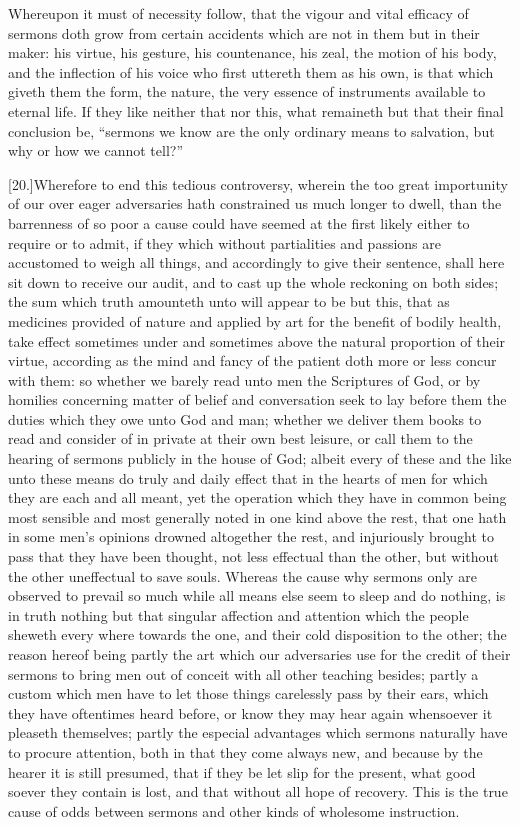 Whereupon it must of necessity follow, that the vigour and vital efficacy of sermons doth grow from certain accidents which are not in them but in their maker: his virtue, his gesture, his countenance, his zeal, the motion of his body, and the inflection of his voice who first uttereth them as his own, is that which giveth them the form, the nature, the very essence of instruments available to eternal life. If they like neither that nor this, what remaineth but that their final conclusion be, “sermons we know are the only ordinary means to salvation, but why or how we cannot tell?”

[20.]Wherefore to end this tedious controversy, wherein the too great importunity of our over eager adversaries hath constrained us much longer to dwell, than the barrenness of so poor a cause could have seemed at the first likely either to  require or to admit, if they which without partialities and passions are accustomed to weigh all things, and accordingly to give their sentence, shall here sit down to receive our audit, and to cast up the whole reckoning on both sides; the sum which truth amounteth unto will appear to be but this, that as medicines provided of nature and applied by art for the benefit of bodily health, take effect sometimes under and sometimes above the natural proportion of their virtue, according as the mind and fancy of the patient doth more or less concur with them: so whether we barely read unto men the Scriptures of God, or by homilies concerning matter of belief and conversation seek to lay before them the duties which they owe unto God and man; whether we deliver them books to read and consider of in private at their own best leisure, or call them to the hearing of sermons publicly in the house of God; albeit every of these and the like unto these means do truly and daily effect that in the hearts of men for which they are each and all meant, yet the operation which they have in common being most sensible and most generally noted in one kind above the rest, that one hath in some men’s opinions drowned altogether the rest, and injuriously brought to pass that they have been thought, not less effectual than the other, but without the other uneffectual to save souls. Whereas the cause why sermons only are observed to prevail so much while all means else seem to sleep and do nothing, is in truth nothing but that singular affection and attention which the people sheweth every where towards the one, and their cold disposition to the other; the reason hereof being partly the art which our adversaries use for the credit of their sermons to bring men out of conceit with all other teaching besides; partly a custom which men have to let those things carelessly pass by their ears, which they have oftentimes heard before, or know they may hear again whensoever it pleaseth themselves; partly the especial advantages which sermons naturally have to procure attention, both in that they come always new, and because by the hearer it is still presumed, that if they be let slip for the present, what good soever they contain is lost, and that without all hope of recovery. This is the true cause of odds between sermons and other kinds of wholesome instruction.



